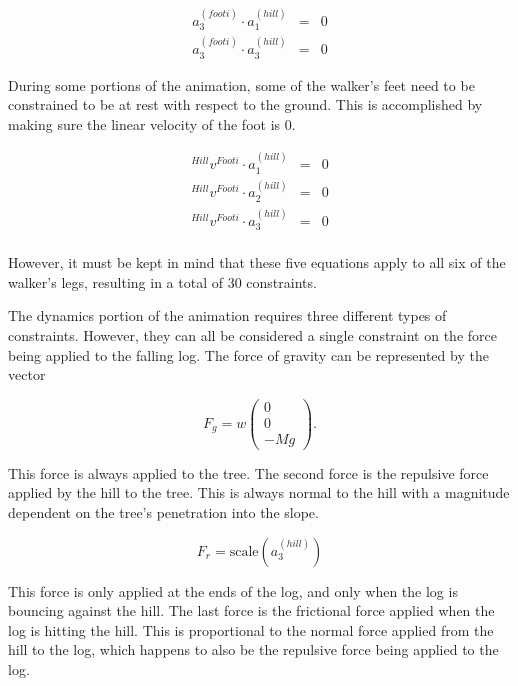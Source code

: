 \documentclass{article}
\begin{document}
\begin{eqnarray*}
a_3^{(footi)} \cdot a_1^{(hill)} & = & 0 \\
a_3^{(footi)} \cdot a_3^{(hill)} & = & 0
\end{eqnarray*}

During some portions of the animation, some of the walker's feet need to be constrained to be at rest with respect to the ground. This is accomplished by making sure the linear velocity of the foot is 0.

\begin{eqnarray*}
{}^{Hill}v^{Footi} \cdot a_1^{(hill)} & = & 0 \\
{}^{Hill}v^{Footi} \cdot a_2^{(hill)} & = & 0 \\
{}^{Hill}v^{Footi} \cdot a_3^{(hill)} & = & 0 \\
\end{eqnarray*}

However, it must be kept in mind that these five equations apply to all six of the walker's legs, resulting in a total of 30 constraints.%

The dynamics portion of the animation requires three different types of constraints. However, they can all be considered a single constraint on the force being applied to the falling log. The force of gravity can be represented by the vector

\begin{equation*}
F_g = w\left(\begin{array}{c} 0 \\ 0 \\ -Mg \end{array}\right)\text{.}
\end{equation*}

This force is always applied to the tree. The second force is the repulsive force applied by the hill to the tree. This is always normal to the hill with a magnitude dependent on the tree's penetration into the slope.

\begin{equation*}
F_r = \text{scale}\left(a_3^{(hill)}\right)
\end{equation*}

This force is only applied at the ends of the log, and only when the log is bouncing against the hill. The last force is the frictional force applied when the log is hitting the hill. This is proportional to the normal force applied from the hill to the log, which happens to also be the repulsive force being applied to the log. 
\end{document}
